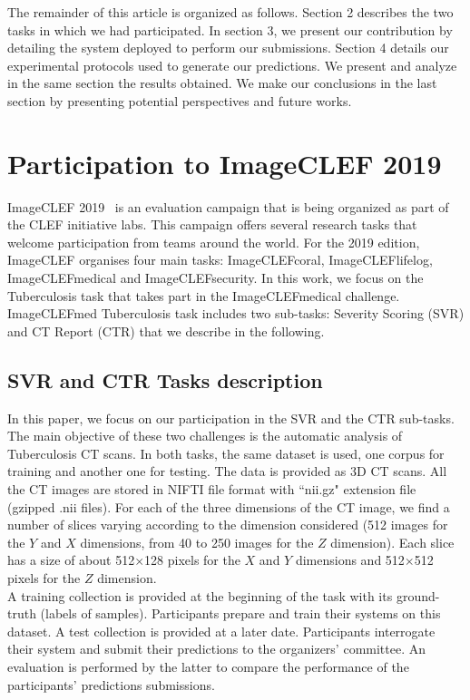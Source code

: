 \documentclass{llncs}
\begin{document}
The remainder of this article is organized as follows. Section 2 describes the two tasks in which we had participated. In section 3, we present our contribution by detailing the system deployed to perform our submissions. Section 4 details our experimental protocols used to generate our predictions. We present and analyze in the same section the results obtained. We make our conclusions in the last section by presenting potential perspectives and future works.

\section{Participation to ImageCLEF 2019}

ImageCLEF 2019~\cite{ImageCLEF19} is an evaluation campaign that is being organized as part of the CLEF initiative labs. This campaign offers several research tasks that welcome participation from teams around the world. For the 2019 edition, ImageCLEF organises four main tasks: ImageCLEFcoral, ImageCLEFlifelog, ImageCLEFmedical and ImageCLEFsecurity. In this work, we focus on the Tuberculosis task that takes part in the ImageCLEFmedical challenge. ImageCLEFmed Tuberculosis task includes two sub-tasks: Severity Scoring (SVR) and CT Report (CTR) that we describe in the following.

\subsection{SVR and CTR Tasks description}
In this paper, we focus on our participation in the SVR and the CTR sub-tasks. The main objective of these two challenges is the automatic analysis of Tuberculosis CT scans. In both tasks, the same dataset is used, one corpus for training and another one for testing. The data is provided as 3D CT scans. All the CT images are stored in NIFTI file format with ``nii.gz" extension file (gzipped .nii files). For each of the three dimensions of the CT image, we find a number of slices varying according to the dimension considered (512 images for the $Y$ and $X$ dimensions, from 40 to 250 images for the $Z$ dimension). Each slice has a size of about 512$\times$128 pixels for the $X$ and $Y$ dimensions and 512$\times$512 pixels for the $Z$ dimension.\\

A training collection is provided at the beginning of the task with its ground-truth (labels of samples). Participants prepare and train their systems on this dataset. A test collection is provided at a later date. Participants interrogate their system and submit their predictions to the organizers' committee. An evaluation is performed by the latter to compare the performance of the participants' predictions submissions.
\end{document}

